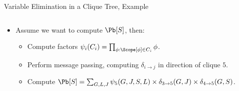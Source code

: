 \begin{frame}{Variable Elimination in a Clique Tree, Example}
\begin{example}
\begin{columns}[T]
    \end{columns}
        \begin{itemize}
        \pause\item Assume we want to compute $\Pb[S]$, then:
        \begin{itemize}
            \pause \item Compute factors $\psi_i(C_i) = \prod_{\phi: \Scope[\phi] \in C_i} \phi$.
            \pause \item Perform message passing, computing $\delta_{i \rightarrow j}$ in direction of clique $5$.
            \pause \item Compute $\Pb[S] = \sum_{G,L,J} \psi_5(G,J,S,L) \times \delta_{3 \rightarrow 5}(G,J) \times \delta_{4 \rightarrow 5}(G,S)$.
        \end{itemize}
        \end{itemize}
\end{example}
\end{frame}


